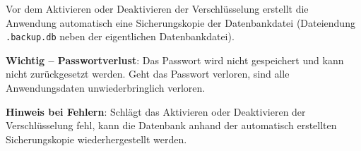 Vor dem Aktivieren oder Deaktivieren der Verschlüsselung erstellt die Anwendung automatisch eine Sicherungskopie der Datenbankdatei (Dateiendung \texttt{.backup.db} neben der eigentlichen Datenbankdatei).

\begin{infobox}
\textbf{Wichtig -- Passwortverlust}: Das Passwort wird nicht gespeichert und kann nicht zurückgesetzt werden. Geht das Passwort verloren, sind alle Anwendungsdaten unwiederbringlich verloren.
\end{infobox}

\begin{infobox}
\textbf{Hinweis bei Fehlern}: Schlägt das Aktivieren oder Deaktivieren der Verschlüsselung fehl, kann die Datenbank anhand der automatisch erstellten Sicherungskopie wiederhergestellt werden.
\end{infobox}
